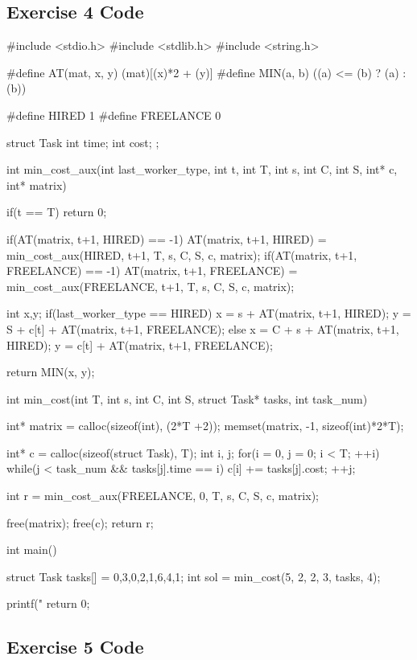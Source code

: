 \documentclass[paper=a4, fontsize=11pt]{scrartcl} %
\numberwithin{equation}{section} %
\numberwithin{figure}{section} %
\numberwithin{table}{section} %
\begin{document}
\subsection*{Exercise 4 Code}

\begin{ccode}
#include <stdio.h>
#include <stdlib.h>
#include <string.h>

#define AT(mat, x, y) (mat)[(x)*2 + (y)]
#define MIN(a, b) ((a) <= (b) ? (a) : (b))

#define HIRED 1
#define FREELANCE 0

struct Task
{
    int time;
    int cost;
};

int min_cost_aux(int last_worker_type, int t, int T, int s, int C, int S, int* c, int* matrix)
{
  if(t == T)
    return 0;
  
  if(AT(matrix, t+1, HIRED) == -1)
    AT(matrix, t+1, HIRED) = min_cost_aux(HIRED, t+1, T, s, C, S, c, matrix);
  if(AT(matrix, t+1, FREELANCE) == -1)
    AT(matrix, t+1, FREELANCE) = min_cost_aux(FREELANCE, t+1, T, s, C, S, c, matrix);
  
  int x,y;
  if(last_worker_type == HIRED) {
    x = s + AT(matrix, t+1, HIRED);
    y = S + c[t] + AT(matrix, t+1, FREELANCE);
  }
  else {
    x = C + s + AT(matrix, t+1, HIRED);
    y = c[t] + AT(matrix, t+1, FREELANCE);
  }
  
  return MIN(x, y);
}


int min_cost(int T, int s, int C, int S, struct Task* tasks, int task_num)
{
    int* matrix = calloc(sizeof(int), (2*T +2));
    memset(matrix, -1, sizeof(int)*2*T);
    
    int* c = calloc(sizeof(struct Task), T);
    int i, j;
    for(i = 0, j = 0; i < T; ++i) {
        while(j < task_num && tasks[j].time == i) {
            c[i] += tasks[j].cost;
            ++j;
        }
    }
    
    int r = min_cost_aux(FREELANCE, 0, T, s, C, S, c, matrix);
    
    free(matrix);
    free(c);
    return r;
}

int main()
{
    struct Task tasks[] = {{0,3},{0,2},{1,6},{4,1}};
    int sol = min_cost(5, 2, 2, 3, tasks, 4);
    
    printf("%
    return 0;
}
\end{ccode}

\newpage

\subsection*{Exercise 5 Code}
\end{document}
